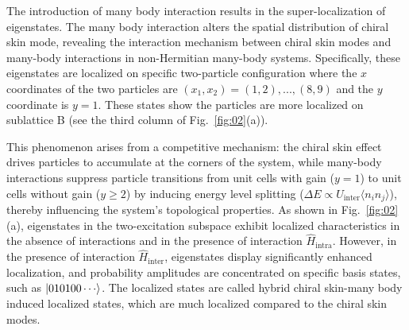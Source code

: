 \documentclass[longbibliography, aps, prx, amsmath, amssymb, amsfonts, twocolumn,superscriptaddress, footinbib]{revtex4-1}
\begin{document}
	The introduction of many body interaction results in the super-localization of eigenstates. The many body interaction alters the spatial distribution of chiral skin mode, revealing the interaction mechanism between chiral skin modes and many-body interactions in non-Hermitian many-body systems. Specifically, these eigenstates are localized on specific two-particle configuration where the $x$ coordinates of the two particles are $(x_1,x_2)=(1,2),...,(8,9)$ and the $y$ coordinate is $y=1$. These states show the particles are more localized on sublattice B (see the third column of Fig.~\ref{fig:02}(a)).


	This phenomenon arises from a competitive mechanism: the chiral skin effect drives particles to accumulate at the corners of the system, while many-body interactions suppress particle transitions from unit cells with gain ($y=1$) to unit cells without gain ($y \geq 2$) by inducing energy level splitting ($\Delta E \propto U_{\text{inter}}\langle n_i n_j \rangle$), thereby influencing the system's topological properties.
	As shown in Fig.~\ref{fig:02}(a), eigenstates in the two-excitation subspace exhibit localized characteristics in the absence of interactions and in the presence of interaction $\hat{H}_{\text{intra}}$. However, in the presence of interaction $\hat{H}_{\text{inter}}$, eigenstates display significantly enhanced localization, and probability amplitudes are concentrated on specific basis states, such as $\ket{010100\cdots}$. 
	The localized states are called hybrid chiral skin-many body induced localized states, which are much localized compared to the chiral skin modes.
\end{document}
